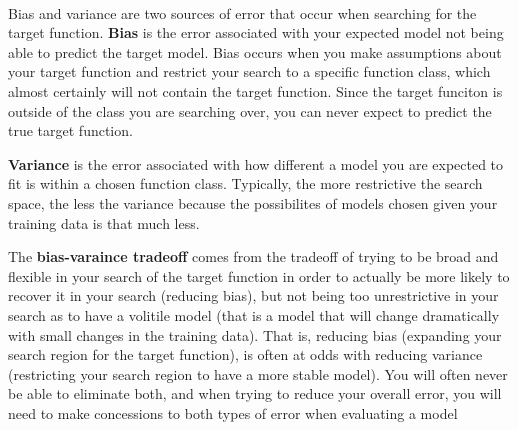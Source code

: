 \documentclass[11pt]{article}
\begin{document}
\begin{center}

\ \\
\end{center}


\vspace{5 mm}
\noindent
Bias and variance are two sources of error that occur when searching for the 
target function. {\bf Bias} is the error associated with your expected model 
not being able to predict the target model. Bias occurs when you make 
assumptions about your target function and restrict your search to a specific 
function class, which almost certainly will not contain the target function. 
Since the target funciton is outside of the class you are searching over, you 
can never expect to predict the true target function.

\vspace{5 mm}
\noindent
{\bf Variance} is the error associated with how different a model you are 
expected to fit is within a chosen function class. Typically, the more 
restrictive the search space, the less the variance because the possibilites of 
models chosen given your training data is that much less.

\vspace{5 mm}
\noindent
The {\bf bias-varaince tradeoff} comes from the tradeoff of trying to be broad 
and flexible in your search of the target function in order to actually be more 
likely to recover it in your search (reducing bias), but not being too 
unrestrictive in your search as to have a volitile model (that is a model that 
will change dramatically with small changes in the training data). That is, 
reducing bias (expanding your search region for the target function), is often 
at odds with reducing variance (restricting your search region to have a more 
stable model). You will often never be able to eliminate both, and when trying 
to reduce your overall error, you will need to make concessions to both types 
of error when evaluating a model
\end{document}
